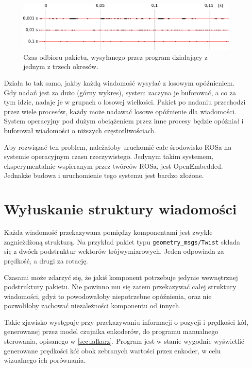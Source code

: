 	\begin{figure}[H]
	\centering
	\includegraphics[width=\textwidth]{graphics/gramofon.pdf}
	\caption{Czas odbioru pakietu, wysyłanego przez program działający z jednym z trzech okresów.}
	\end{figure}
	
	Działa to tak samo, jakby każdą wiadomość wysyłać z losowym opóźnieniem.
	Gdy nadań jest za dużo (górny wykres), system zaczyna je buforować, a co za tym idzie, nadaje je w grupach o losowej wielkości.
	Pakiet po nadaniu przechodzi przez wiele procesów, każdy może nadawać losowe opóźnienie dla wiadomości.
	System operacyjny pod dużym obciążeniem przez inne procesy będzie opóźniał i buforował wiadomości o niższych częstotliwościach.
	
	Aby rozwiązać ten problem, należałoby uruchomić całe środowisko ROSa na systemie operacyjnym czasu rzeczywistego.
	Jedynym takim systemem, eksperymentalnie wspieranym przez twórców ROSa, jest OpenEmbedded.
	Jednakże budowa i uruchomienie tego systemu jest bardzo złożone.
		
\section{Wyłuskanie struktury wiadomości}
	\label{sec:dziadzio}
	Każda wiadomość przekazywana pomiędzy komponentami jest zwykle zagnieżdżoną strukturą.
	Na przykład pakiet typu \texttt{geometry\_msgs/Twist} składa się z dwóch podstruktur wektorów trójwymiarowych.
	Jeden odpowiada za prędkość, a drugi za rotację.
	
	Czasami może zdarzyć się, że jakiś komponent potrzebuje jedynie wewnętrznej podstruktury pakietu.
	Nie powinno mu się zatem przekazywać całej struktury wiadomości, gdyż to powodowałoby niepotrzebne opóźnienia, oraz nie pozwoliłoby zachować niezależności 
	komponentu od innych.
	
	Takie zjawisko występuje przy przekazywaniu informacji o pozycji i prędkości kół, generowanej przez model czujnika enkoderów, do programu
	manualnego sterowania, opisanego w \ref{sec:lalkarz}.
	Program jest w stanie wygodnie wyświetlić generowane prędkości kół obok zebranych wartości przez enkoder, w celu wizualnego ich porównania.
	
